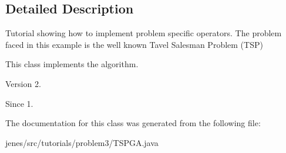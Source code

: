 \subsection{Detailed Description}
Tutorial showing how to implement problem specific operators. The problem faced in this example is the well known Tavel Salesman Problem (T\-S\-P)

This class implements the algorithm.

\begin{DoxyVersion}{Version}
2. 
\end{DoxyVersion}
\begin{DoxySince}{Since}
1. 
\end{DoxySince}


The documentation for this class was generated from the following file\-:\begin{DoxyCompactItemize}
\item 
jenes/src/tutorials/problem3/T\-S\-P\-G\-A.\-java\end{DoxyCompactItemize}
